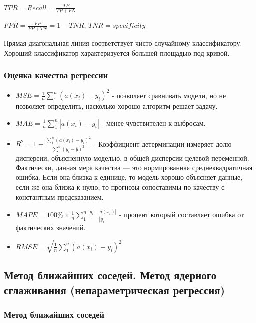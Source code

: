\documentclass{article}
\begin{document}
$TPR = Recall = \frac{TP}{TP + FN}$

$FPR = \frac{FP}{FP + TN} = 1 - TNR$, $TNR = specificity$

Прямая диагональная линия соответствует чисто случайному классификатору.
Хороший классификатор характеризуется большей площадью под кривой.


\subsubsection{Оценка качества регрессии}

\begin{itemize}
	\item $MSE = \frac{1}{n} \sum\limits_1^n (a(x_i) - y_i)^2$ - позволяет сравнивать модели, но
	не позволяет определить, насколько хорошо алгоритм решает задачу.
	\item $MAE = \frac{1}{n} \sum\limits_1^n |a(x_i) - y_i|$ - менее чувствителен к выбросам.
	\item $R^2 = 1 - \frac{\sum\limits_1^n (a(x_i) - y_i)^2}{\sum\limits_1^n (y_i - \overline{y})^2}$ -
	Коэффициент детерминации измеряет долю дисперсии, объясненную моделью, в общей дисперсии целевой
	переменной. Фактически, данная мера качества — это нормированная среднеквадратичная ошибка. Если
	она близка к единице, то модель хорошо объясняет данные, если же она близка к нулю, то прогнозы
	сопоставимы по качеству с константным предсказанием.
	\item $MAPE = 100\% \times \frac{1}{n}\sum\limits_1^n \frac{|y_i - a(x_i)|}{|y_i|}$ - процент
	который составляет ошибка от фактических значений.
	\item $RMSE = \sqrt{\frac{1}{n} \sum\limits_1^n (a(x_i) - y_i)^2}$
\end{itemize}


\subsection{Метод ближайших соседей. Метод ядерного сглаживания (непараметрическая
регрессия)}

\subsubsection{Метод ближайших соседей}

\end{document}
